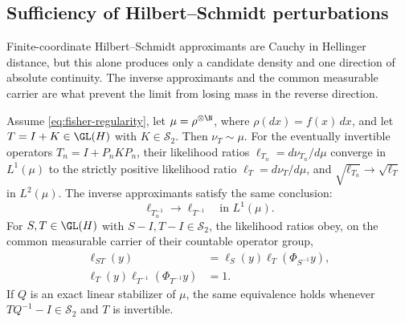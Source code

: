 \subsection{Sufficiency of Hilbert--Schmidt perturbations}
\label{sec:sufficiency}

Finite-coordinate Hilbert--Schmidt approximants are Cauchy in Hellinger
distance, but this alone produces only a candidate density and one direction
of absolute continuity.  The inverse approximants and the common measurable
carrier are what prevent the limit from losing mass in the reverse direction.

\begin{proposition}
\label{prop:hilbert-schmidt-sufficiency}
Assume \eqref{eq:fisher-regularity}, let
$\mu=\rho^{\otimes\N}$, where $\rho(dx)=f(x)\,dx$, and let
$T=I+K\in\GL(H)$ with $K\in\mathcal S_2$.
Then \(\nu_T\sim\mu\).
For the eventually invertible operators
$T_n=I+P_nKP_n$, their likelihood ratios
$\ell_{T_n}=d\nu_{T_n}/d\mu$ converge in $L^1(\mu)$ to the strictly
positive likelihood ratio $\ell_T=d\nu_T/d\mu$, and
$\sqrt{\ell_{T_n}}\to\sqrt{\ell_T}$ in $L^2(\mu)$.
The inverse approximants satisfy the same conclusion:
\[
 \ell_{T_n^{-1}}\longrightarrow\ell_{T^{-1}}
 \quad\text{in }L^1(\mu).
\]
For $S,T\in\GL(H)$ with $S-I,T-I\in\mathcal S_2$, the
likelihood ratios obey, on the common measurable carrier of their countable
operator group,
\begin{align}
 \ell_{ST}(y)&=\ell_S(y)\ell_T(\Phi_{S^{-1}}y),
   \label{eq:rn-cocycle}\\
 \ell_T(y)\ell_{T^{-1}}(\Phi_{T^{-1}}y)&=1.
   \label{eq:rn-inverse}
\end{align}
If $Q$ is an exact linear stabilizer of $\mu$, the same equivalence
holds whenever \(TQ^{-1}-I\in\mathcal S_2\) and \(T\) is invertible.
\end{proposition}

